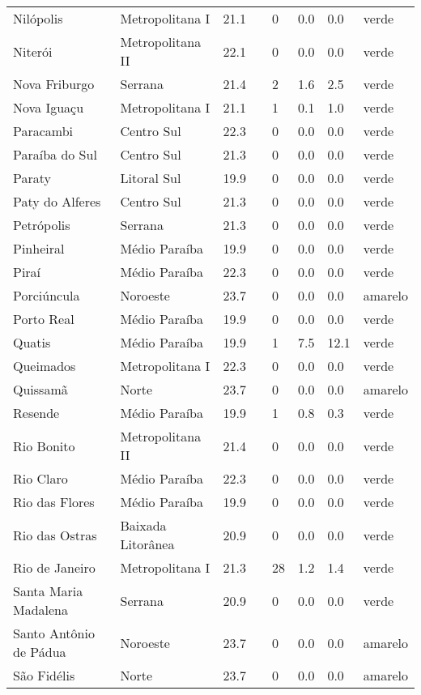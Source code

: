 \begin{longtable}{l|lllllll}
  Nilópolis & Metropolitana I & 21.1 &  & 0 & 0.0 & 0.0 & verde \\ 
  Niterói & Metropolitana II & 22.1 &  & 0 & 0.0 & 0.0 & verde \\ 
  Nova Friburgo & Serrana & 21.4 &  & 2 & 1.6 & 2.5 & verde \\ 
  Nova Iguaçu & Metropolitana I & 21.1 &  & 1 & 0.1 & 1.0 & verde \\ 
  Paracambi & Centro Sul & 22.3 &  & 0 & 0.0 & 0.0 & verde \\ 
  Paraíba do Sul & Centro Sul & 21.3 &  & 0 & 0.0 & 0.0 & verde \\ 
  Paraty & Litoral Sul & 19.9 &  & 0 & 0.0 & 0.0 & verde \\ 
  Paty do Alferes & Centro Sul & 21.3 &  & 0 & 0.0 & 0.0 & verde \\ 
  Petrópolis & Serrana & 21.3 &  & 0 & 0.0 & 0.0 & verde \\ 
  Pinheiral & Médio Paraíba & 19.9 &  & 0 & 0.0 & 0.0 & verde \\ 
  Piraí & Médio Paraíba & 22.3 &  & 0 & 0.0 & 0.0 & verde \\ 
  Porciúncula & Noroeste & 23.7 &  & 0 & 0.0 & 0.0 & amarelo \\ 
  Porto Real & Médio Paraíba & 19.9 &  & 0 & 0.0 & 0.0 & verde \\ 
  Quatis & Médio Paraíba & 19.9 &  & 1 & 7.5 & 12.1 & verde \\ 
  Queimados & Metropolitana I & 22.3 &  & 0 & 0.0 & 0.0 & verde \\ 
  Quissamã & Norte & 23.7 &  & 0 & 0.0 & 0.0 & amarelo \\ 
  Resende & Médio Paraíba & 19.9 &  & 1 & 0.8 & 0.3 & verde \\ 
  Rio Bonito & Metropolitana II & 21.4 &  & 0 & 0.0 & 0.0 & verde \\ 
  Rio Claro & Médio Paraíba & 22.3 &  & 0 & 0.0 & 0.0 & verde \\ 
  Rio das Flores & Médio Paraíba & 19.9 &  & 0 & 0.0 & 0.0 & verde \\ 
  Rio das Ostras & Baixada Litorânea & 20.9 &  & 0 & 0.0 & 0.0 & verde \\ 
  Rio de Janeiro & Metropolitana I & 21.3 &  & 28 & 1.2 & 1.4 & verde \\ 
  Santa Maria Madalena & Serrana & 20.9 &  & 0 & 0.0 & 0.0 & verde \\ 
  Santo Antônio de Pádua & Noroeste & 23.7 &  & 0 & 0.0 & 0.0 & amarelo \\ 
  São Fidélis & Norte & 23.7 &  & 0 & 0.0 & 0.0 & amarelo \\ 

\end{longtable}
